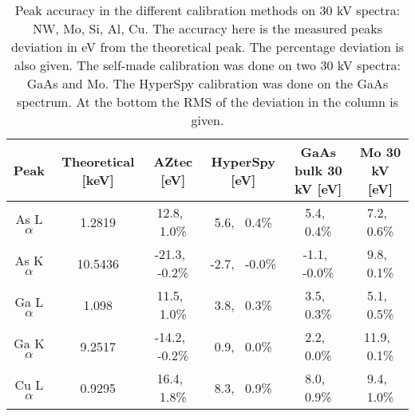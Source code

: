
\begin{table}[p]
    \centering
    \caption{
        Peak accuracy in the different calibration methods on 30 kV spectra: NW, Mo, Si, Al, Cu. %
        The accuracy here is the measured peaks deviation in eV from the theoretical peak.
        The percentage deviation is also given.
        The self-made calibration was done on two 30 kV spectra: GaAs and Mo. %
        The HyperSpy calibration was done on the GaAs spectrum.
        At the bottom the RMS of the deviation in the column is given.
    }
    \label{tab:results:calibration-peak-accuracy}
    \begin{tabular}{cccccc}
        Peak         & Theoretical [keV] & AZtec  [eV]           & HyperSpy [eV]         & GaAs bulk 30 kV [eV]  & Mo 30 kV [eV]         \\ %
        \hline
        As L$\alpha$ & 1.2819            & 12.8,\,\,\,    1.0\%  & 5.6,\,\,\,    0.4\%   & 5.4,\,\,\,    0.4\%   & 7.2,\,\,\,    0.6\%   \\
        As K$\alpha$ & 10.5436           & -21.3,\,\,\,   -0.2\% & -2.7,\,\,\,   -0.0\%  & -1.1,\,\,\,   -0.0\%  & 9.8,\,\,\,    0.1\%   \\
        Ga L$\alpha$ & 1.098             & 11.5,\,\,\,    1.0\%  & 3.8,\,\,\,    0.3\%   & 3.5,\,\,\,    0.3\%   & 5.1,\,\,\,    0.5\%   \\
        Ga K$\alpha$ & 9.2517            & -14.2,\,\,\,   -0.2\% & 0.9,\,\,\,    0.0\%   & 2.2,\,\,\,    0.0\%   & 11.9,\,\,\,    0.1\%  \\
        Cu L$\alpha$ & 0.9295            & 16.4,\,\,\,    1.8\%  & 8.3,\,\,\,    0.9\%   & 8.0,\,\,\,    0.9\%   & 9.4,\,\,\,    1.0\%   \\

\end{tabular}
\end{table}
